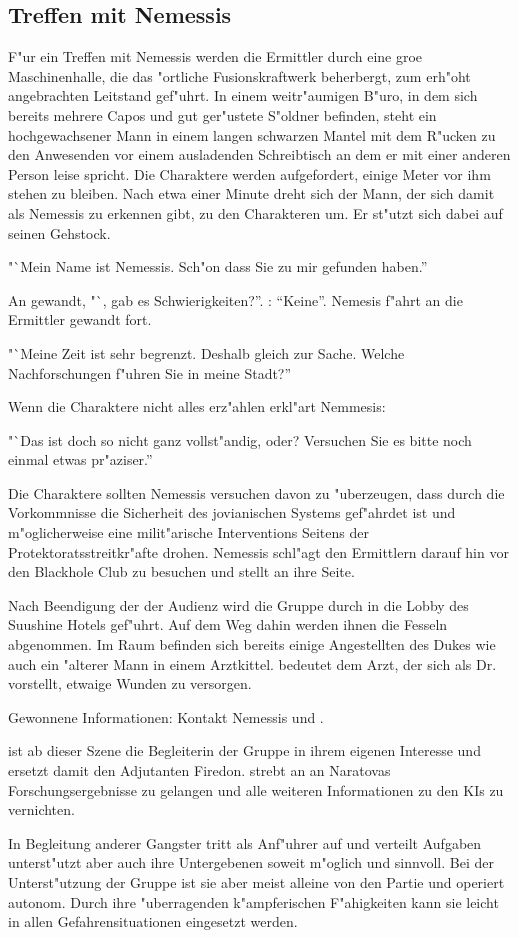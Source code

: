 \subsection{Treffen mit Nemessis}

F"ur ein Treffen mit Nemessis werden die Ermittler durch eine gro\3e Maschinenhalle, die das "ortliche Fusionskraftwerk beherbergt, zum erh"oht angebrachten Leitstand gef"uhrt. In einem weitr"aumigen B"uro, in dem sich bereits mehrere Capos und gut ger"ustete S"oldner befinden, steht ein hochgewachsener Mann in einem langen schwarzen Mantel mit dem R"ucken zu den Anwesenden vor einem ausladenden Schreibtisch an dem er mit einer anderen Person leise spricht. Die Charaktere werden aufgefordert, einige Meter vor ihm stehen zu bleiben. Nach etwa einer Minute dreht sich der Mann, der sich damit als Nemessis zu erkennen gibt, zu den Charakteren um. Er st"utzt sich dabei auf seinen Gehstock.

"`Mein Name ist Nemessis. Sch"on dass Sie zu mir gefunden haben.'' 

An \xl{} gewandt, "`\xlsn{}, gab es Schwierigkeiten?''. \xl{}:  "`Keine"'. Nemesis f"ahrt an die Ermittler gewandt fort. 

"`Meine Zeit ist sehr begrenzt. Deshalb gleich zur Sache. Welche Nachforschungen f"uhren Sie in meine Stadt?''

Wenn die Charaktere nicht alles erz"ahlen erkl"art Nemmesis:

"`Das ist doch so nicht ganz vollst"andig, oder? Versuchen Sie es bitte noch einmal etwas pr"aziser.''

Die Charaktere sollten Nemessis versuchen davon zu "uberzeugen, dass durch die Vorkommnisse die Sicherheit des jovianischen Systems gef"ahrdet ist und m"oglicherweise eine milit"arische Interventions Seitens der Protektoratsstreitkr"afte drohen. Nemessis schl"agt den Ermittlern darauf hin vor den Blackhole Club zu besuchen und stellt \xl{} an ihre Seite.

Nach Beendigung der der Audienz wird die Gruppe durch \xlsn{} in die Lobby des Suushine Hotels gef"uhrt. Auf dem Weg dahin werden ihnen die Fesseln abgenommen. Im Raum befinden sich bereits einige Angestellten des Dukes wie auch ein "alterer Mann in einem Arztkittel. \xlsn{} bedeutet dem Arzt, der sich als Dr.~  vorstellt, etwaige Wunden zu versorgen.

\begin{remarks}
	Gewonnene Informationen: Kontakt Nemessis und \xl{}.

	\xl{} ist ab dieser Szene die Begleiterin der Gruppe in ihrem eigenen Interesse und ersetzt damit den Adjutanten Firedon. \xl{} strebt an an Naratovas Forschungsergebnisse zu gelangen und alle weiteren Informationen zu den KIs zu vernichten.

	In Begleitung anderer Gangster tritt \xl{} als Anf"uhrer auf und verteilt Aufgaben unterst"utzt aber auch ihre Untergebenen soweit m"oglich und sinnvoll. Bei der Unterst"utzung der Gruppe ist sie aber meist alleine von den Partie und operiert autonom. Durch ihre "uberragenden k"ampferischen F"ahigkeiten kann sie leicht in allen Gefahrensituationen eingesetzt werden.
\end{remarks}


